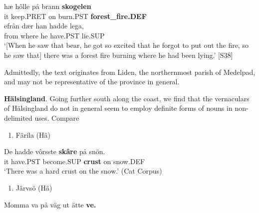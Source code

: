 \ea\label{}
\gll hæ  hôlle  på  brann  \textbf{skogelen}\\


it  keep.PRET  on  burn.PST  \textbf{forest\_fire.DEF}\\ %


\ea\label{}
\gll efrån  dær  han  hadde  lega,\\


from  where  he   have.PST  lie.SUP\\ %


 ‘[When he saw that bear, he got so excited that he forgot to put out the fire, so he saw that] there was a forest fire burning where he had been lying.’ [S38]
\z


Admittedly, the text originates from Liden, the northernmost parish of Medelpad, and may not be representative of the province in general. 

\textbf{Hälsingland}. Going further south along the coast, we find that the vernaculars of Hälsingland do not in general seem to employ definite forms of nouns in non-delimited uses. Compare 

\begin{enumerate} %
\item 
Färila (Hä)

\end{enumerate} %
\ea\label{}
\gll De  hadde  vôrsste  \textbf{skâre} på  snön.\\


it  have.PST  become.SUP  \textbf{crust} on  snow.DEF\\ %


‘There was a hard crust on the snow.’ (Cat Corpus)
\z


\begin{enumerate} %
\item 
Järvsö (Hä)

\end{enumerate} %
\ea\label{}
\gll Momma  va  på  väg  ut  ätte  \textbf{ve.}\\


